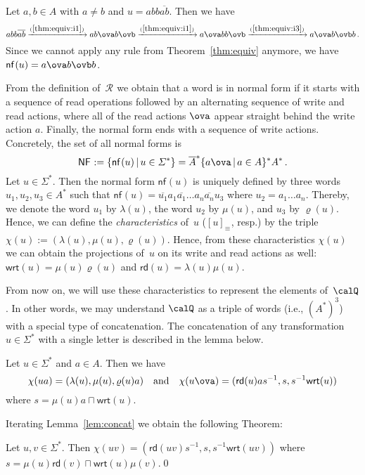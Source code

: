 \documentclass[a4paper,numberwithinsect,USenglish]{lipics-v2018}
\theoremstyle{plain}
\theoremstyle{remark}
\newcommand{\ov}[1]{\overline{#1}}
\newcommand{\classfont}[1]{\mathsf{#1}}
\newcommand{\nf}{\classfont{nf}}
\newcommand{\NF}{\classfont{NF}}
\newcommand{\rd}[1]{\mathsf{rd}(#1)}
\newcommand{\wrt}[1]{\mathsf{wrt}(#1)}
\newcommand{\nfx}[2][]{\nf_{#1}(#2)}
\newcommand{\NFx}[1][]{\NF_{#1}}
\newcommand{\equivx}[1][]{\equiv_{#1}}
\newcommand{\Qx}{\calQ}
\newcommand{\Rx}[1][]{\mathcal{R}_{#1}}
\newcommand{\chr}[1]{\chi(#1)}
\newcommand{\inv}[1]{#1^{-1}}
\newcommand{\lft}[1]{\lambda(#1)}
\newcommand{\mddl}[1]{\mu(#1)}
\newcommand{\rght}[1]{\varrho(#1)}
\begin{document}
\begin{example}\label{ex:nfx}
	Let $a,b\in A$ with $a\neq b$ and $u=abb\ov{ab}$. Then we have
	\[
	abb\ov{ab}\xrightarrow{(\ref{thm:equiv:i1})} ab\ova b\ovb\xrightarrow{(\ref{thm:equiv:i1})} a\ova bb\ovb\xrightarrow{(\ref{thm:equiv:i3})} a\ova b\ovb b\,.
	\]
	Since we cannot apply any rule from Theorem~\ref{thm:equiv} anymore, we have $\nfx{u}=a\ova b\ovb b$.
\end{example}

From the definition of~$\Rx$ we obtain that a word is in normal form if it starts with a sequence of read operations followed by an alternating sequence of write and read actions, where all of the read actions $\ova$ appear straight behind the write action $a$. Finally, the normal form ends with a sequence of write actions. Concretely, the set of all normal forms is
\[\NFx:=\{\nfx{u}\,|\,u\in\varSigma^*\}=\ov{A}^*\{a\ova\,|\,a\in A\}^*A^*\,.\]
Let $u\in\varSigma^*$. Then the normal form $\nfx{u}$ is uniquely defined by three words $u_1,u_2,u_3\in A^*$ such that $\nfx{u}=\ov{u_1}a_1\ov{a_1}\dots a_n\ov{a_n}u_3$ where $u_2=a_1\dots a_n$. Thereby, we denote the word $u_1$ by $\lft{u}$, the word $u_2$ by $\mddl{u}$, and $u_3$ by $\rght{u}$. Hence, we can define the \emph{characteristics} of~$u$ ($[u]_{\equivx}$, resp.) by the triple 
$\chr{u}:=(\lft{u},\mddl{u},\rght{u})$.
Hence, from these characteristics $\chr{u}$ we can obtain the projections of~$u$ on its write and read actions as well: $\wrt{u}=\mddl{u}\rght{u}$ and $\rd{u}=\lft{u}\mddl{u}$.

From now on, we will use these characteristics to represent the elements of~$\Qx$. In other words, we may understand $\Qx$ as a triple of words (i.e., $(A^*)^3$) with a special type of concatenation. The concatenation of any transformation $u\in\varSigma^*$ with a single letter is described in the lemma below.
\begin{lemma}\label{lem:concat}
	Let $u\in\varSigma^*$ and $a\in A$. Then we have
	\[\chr{ua}=(\lft{u},\mddl{u},\rght{u}a)\quad\text{and}\quad \chr{u\ova}=(\rd{u}a\inv{s},s,\inv{s}\wrt{u})\]
	where $s=\mddl{u}a\sqcap\wrt{u}$.
\end{lemma}

Iterating Lemma~\ref{lem:concat} we obtain the following Theorem:

\begin{theorem}\label{thm:concat}
	Let $u,v\in\varSigma^*$. Then
	$\chr{uv}=(\rd{uv}\inv{s},s,\inv{s}\wrt{uv})$
	where $s=\mddl{u}\rd{v}\sqcap\wrt{u}\mddl{v}$.\qed
\end{theorem}
\end{document}
